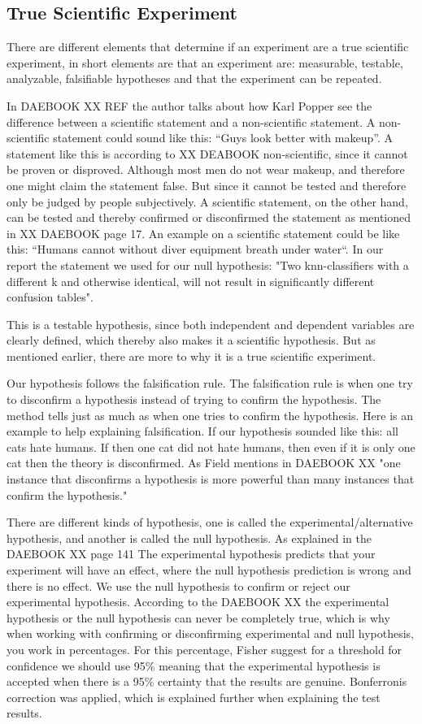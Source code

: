 \subsection{True Scientific Experiment}
There are different elements that determine if an experiment are a true scientific experiment, in short elements are that an experiment are: measurable, testable, analyzable, falsifiable hypotheses and that the experiment can be repeated.

In DAEBOOK XX REF the author talks about how Karl Popper see the difference between a scientific statement and a non-scientific statement. A non-scientific statement could sound like this: “Guys look better with makeup”. A statement like this is according to XX DEABOOK non-scientific, since it cannot be proven or disproved. Although most men do not wear makeup, and therefore one might claim the statement false. But since it cannot be tested and therefore only be judged by people subjectively. 
A scientific statement, on the other hand, can be tested and thereby confirmed or disconfirmed the statement as mentioned in XX DAEBOOK page 17. An example on a scientific statement could be like this: “Humans cannot without diver equipment breath under water“.
In our report the statement we used for our null hypothesis: "Two knn-classifiers with a different k and otherwise identical, will not result in significantly different confusion tables". 

This is a testable hypothesis, since both independent and dependent variables are clearly defined, which thereby also makes it a scientific hypothesis. But as mentioned earlier, there are more to why it is a true scientific experiment. 


Our hypothesis follows the falsification rule.
The falsification rule is when one try to disconfirm a hypothesis instead of trying to confirm the hypothesis. The method tells just as much as when one tries to confirm the hypothesis. Here is an example to help explaining  falsification. If our hypothesis sounded like this: all cats hate humans. If then one cat did not hate humans, then even if it is only one cat then the theory is disconfirmed. As Field mentions in DAEBOOK XX "one instance that disconfirms a hypothesis is more powerful than many instances that confirm the hypothesis."

There are different kinds of hypothesis, one is called the experimental/alternative hypothesis, and another is called the null hypothesis. As explained in the DAEBOOK XX page 141 The experimental hypothesis predicts that your experiment will have an effect, where the null hypothesis prediction is wrong and there is no effect.
We use the null hypothesis to confirm or reject our experimental hypothesis. According to the DAEBOOK XX the experimental hypothesis or the null hypothesis can never be completely true, which is why when working with confirming or disconfirming experimental and null hypothesis, you work in percentages. For this percentage, Fisher suggest for a threshold for confidence we should use 95\% meaning that the experimental hypothesis is accepted when there is a 95\% certainty that the results are genuine. Bonferronis correction was applied, which is explained further when explaining the test results. 

